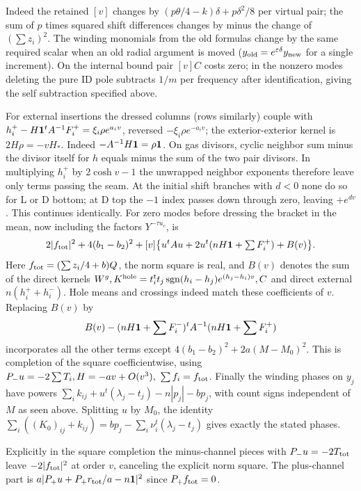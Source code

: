 Indeed the retained \([v]\) changes by \((p\theta/4-k)\delta+p\delta^2/8\) per virtual pair; the sum of \(p\) times squared shift differences changes by minus the change of \((\sum z_i)^2\). The winding monomials from the old formulas change by the same required scalar when an old radial argument is moved (\(y_{\rm old}=e^{\varepsilon\delta}y_{\rm new}\) for a single increment). On the internal bound pair \([v]C\) costs zero; in the nonzero modes deleting the pure ID pole subtracts \(1/m\) per frequency after identification, giving the self subtraction specified above.

For external insertions the dressed columns (rows similarly) couple with \(h_i^+-H{\bf1}^tA^{-1}F_i^+=\xi_i \rho e^{a_i v}\), reversed \(-\xi_i\rho e^{-a_i v}\); the exterior-exterior kernel is \(2H\rho=-vH_*\). Indeed \(-A^{-1}H{\bf1}=\rho {\bf1}\). On gas divisors, cyclic neighbor sum minus the divisor itself for \(h\) equals minus the sum of the two pair divisors. In multiplying \(h_i^+\) by \(2\cosh v-1\) the unwrapped neighbor exponents therefore leave only terms passing the seam. At the initial shift branches with \(d<0\) none do so for L or D bottom; at D top the \(-1\) index passes down through zero, leaving \(+e^{dv}\). This continues identically. For zero modes before dressing the bracket in the mean, now including the factors \(Y^{-\tau u_c}\), is
\[
 2|f_{\rm tot}|^2+4(b_1-b_2)^2
 +[v]\big\{u^tAu+2u^t(nH{\bf1}+\textstyle\sum F_i^+)+B(v)\big\}.
\]
Here \(f_{\rm tot}=(\sum z_i/4+b)Q\), the norm square is real, and \(B(v)\) denotes the sum of the direct kernels \(W^g,K^{\rm hole}=t_i^t t_j\operatorname{sgn}(h_i-h_j)e^{(h_j-h_i)v},C\) and direct external \(n(h_i^++h_i^-)\). Hole means and crossings indeed match these coefficients of \(v\). Replacing \(B(v)\) by
\[
 B(v)-(nH{\bf1}+\sum F_i^-)^t A^{-1}(nH{\bf1}+\sum F_i^+)
\]
incorporates all the other terms except \(4(b_1-b_2)^2+2a(M-M_0)^2\). This is completion of the square coefficientwise, using \(P_-u=-2\sum T_i, H=-av+O(v^3),\ \sum f_i=f_{\rm tot}\). Finally the winding phases on \(y_j\) have powers \(\sum_i k_{ij}+u^t(\lambda_j-t_j)-n|p_j|-bp_j\), with count signs independent of \(M\) as seen above. Splitting \(u\) by \(M_0\), the identity
\(\sum_i((K_0)_{ij}+k_{ij})=b p_j-\sum_i\nu_i^t(\lambda_j-t_j)\)
gives exactly the stated phases.

Explicitly in the square completion the minus-channel pieces with \(P_-u=-2T_{\rm tot}\) leave \(-2|f_{\rm tot}|^2\) at order \(v\), canceling the explicit norm square. The plus-channel part is \(a|P_+u+P_+ r_{\rm tot}/a-n{\bf1}|^2\) since \(P_+f_{\rm tot}=0\).

